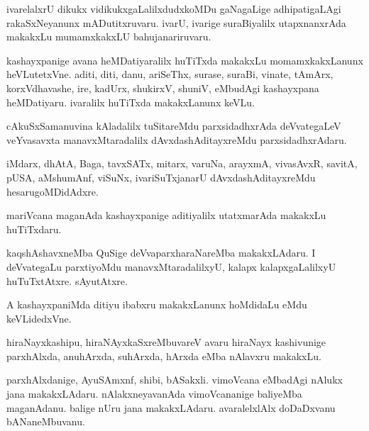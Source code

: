 \documentclass{article}
\begin{document}
\begin{mn}
ivarelalxrU dikukx vidikukxgaLalilxdudxkoMDu gaNagaLige adhipatigaLAgi
rakaSxNeyanunx mADutitxruvaru. ivarU, ivarige suraBiyalilx
utapxnanxrAda makakxLu mumamxkakxLU bahujanariruvaru.
\end{mn}

\begin{mn}%
kashayxpanige avana heMDatiyaralilx huTiTxda makakxLu momamxkakxLanunx
heVLutetxVne. aditi, diti, danu, ariSeThx, surase, suraBi, vinate,
tAmArx, korxVdhavashe, ire, kadUrx, shukirxV, shuniV, eMbudAgi
kashayxpana heMDatiyaru. ivaralilx huTiTxda makakxLanunx keVLu.
\end{mn}

\begin{mn}%
cAkuSxSamanuvina kAladalilx tuSitareMdu parxsidadhxrAda deVvategaLeV
veYvasavxta manavxMtaradalilx dAvxdashAditayxreMdu parxsidadhxrAdaru.
\end{mn}

\begin{mn}
iMdarx, dhAtA, Baga, tavxSATx, mitarx, varuNa, arayxmA, vivasAvxR,
savitA, pUSA, aMshumAnf, viSuNx, ivariSuTxjanarU dAvxdashAditayxreMdu hesarugoMDidAdxre.
\end{mn}

\begin{mn}
mariVcana maganAda kashayxpanige aditiyalilx utatxmarAda makakxLu huTiTxdaru.
\end{mn}

\begin{mn}
kaqshAshavxneMba QuSige deVvaparxharaNareMba makakxLAdaru. I
deVvategaLu parxtiyoMdu manavxMtaradalilxyU, kalapx kalapxgaLalilxyU
huTuTxtAtxre. sAyutAtxre.
\end{mn}

\begin{mn}
A kashayxpaniMda ditiyu ibabxru makakxLanunx hoMdidaLu eMdu keVLidedxVne.
\end{mn}

\begin{mn}%
hiraNayxkashipu, hiraNAyxkaSxreMbuvareV avaru hiraNayx kashivunige
parxhAlxda, anuhArxda, suhArxda, hArxda eMba nAlavxru makakxLu.
\end{mn}

\begin{mn}%
parxhAlxdanige, AyuSAmxnf, shibi, bASakxli. vimoVcana eMbadAgi nAlukx
jana makakxLAdaru. nAlakxneyavanAda vimoVcananige baliyeMba
maganAdanu. balige nUru jana makakxLAdaru. avaralelxlAlx doDaDxvanu bANaneMbuvanu.
\end{mn}
\end{document}
